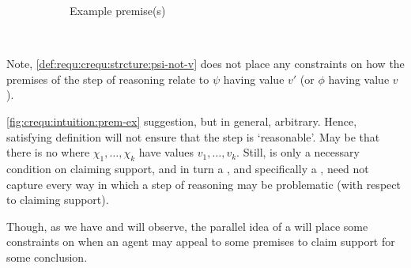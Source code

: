 \begin{figure}[h!]
\begin{subfigure}{0.3\linewidth}
    \caption{Example premise(s)}
    \label{fig:crequ:intuition:prem-ex}
  \end{subfigure}
  \hfill\mbox{ }
  \caption{\crequ{}}
  \label{fig:crequ:intuition}
\end{figure}

\begin{note}[Premises]
  Note, \ref{def:requ:crequ:strcture:psi-not-v} does not place any constraints on how the premises of the step of reasoning relate to \(\psi\) having value \(v'\) (or \(\phi\) having value \(v\)).

  \autoref{fig:crequ:intuition:prem-ex} suggestion, but in general, arbitrary.
  Hence, satisfying definition will not ensure that the step is `reasonable'.
  May be that there is no \epVW{} where \(\chi_{1},\dots,\chi_{k}\) have values \(v_{1},\dots,v_{k}\).
  Still, \ideaCS{} is only a necessary condition on claiming support, and in turn a \requ{}, and specifically a \crequ{}, need not capture every way in which a step of reasoning may be problematic (with respect to claiming support).

  Though, as we have and will observe, the parallel idea of a \prequ{} will place some constraints on when an agent may appeal to some premises to claim support for some conclusion.
\end{note}

